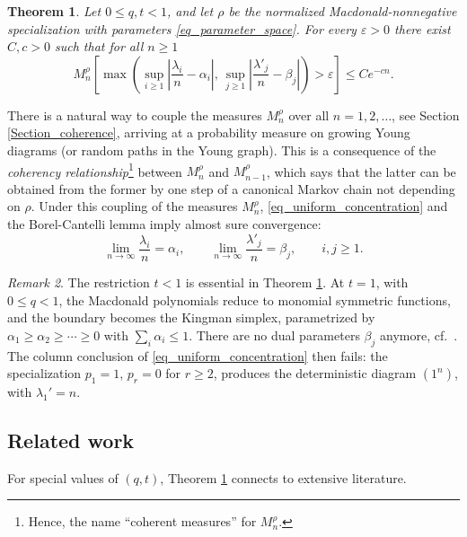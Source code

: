\documentclass[11pt,reqno]{amsart}
\newtheorem{theorem}{Theorem}[section]
\theoremstyle{definition}
\theoremstyle{remark}
\newtheorem{remark}[theorem]{Remark}
\numberwithin{equation}{section}
\begin{document}
\begin{theorem} \label{Theorem_uniform}
 Let $0\le q,t<1$, and let $\rho$ be the normalized Macdonald-nonnegative
specialization with parameters \eqref{eq_parameter_space}. For every $\varepsilon>0$
there exist $C,c>0$ such that for all $n\ge 1$
\begin{equation}\label{eq_uniform_concentration}
 M_n^\rho\left[
 \max\left(\sup_{i\ge1}\left|\frac{\lambda_i}{n}-\alpha_i\right|,
          \, \sup_{j\ge1}\left|\frac{\lambda'_j}{n}-\beta_j\right|\right)
 >\varepsilon\right]\le Ce^{-cn}.
\end{equation}
\end{theorem}

There is a natural way to couple the measures $M_n^\rho$ over all $n=1,2,\dots$, see Section \ref{Section_coherence},
arriving at a probability measure on growing Young diagrams (or random paths in the Young graph). This is a consequence of the \emph{coherency relationship}\footnote{Hence, the name ``coherent measures'' for $M_n^\rho$.} between $M_n^{\rho}$ and $M_{n-1}^\rho$, which says that the latter can be obtained from the former by one step of a canonical
Markov chain not depending on $\rho$.
Under this coupling of the measures $M_n^{\rho}$, \eqref{eq_uniform_concentration} and the Borel-Cantelli lemma imply almost sure convergence:
$$
 \lim_{n\to\infty} \frac{\lambda_i}{n}=\alpha_i,\qquad \lim_{n\to\infty} \frac{\lambda'_j}{n}=\beta_j, \qquad i,j\ge 1.
$$

\begin{remark}
The restriction $t<1$ is essential in Theorem \ref{Theorem_uniform}. At $t=1$, with $0\le q<1$,
the Macdonald polynomials reduce to monomial symmetric functions,
and the boundary becomes the Kingman simplex, parametrized by
$\alpha_1\ge\alpha_2\ge\cdots\ge0$ with $\sum_i\alpha_i\le1$. There are no dual parameters $\beta_j$ anymore, cf.\
\cite[Section~4]{KOO98}. The column conclusion of \eqref{eq_uniform_concentration} then fails:
the specialization $p_1=1$, $p_r=0$ for $r\ge2$, produces
the deterministic diagram $(1^n)$, with $\lambda_1'=n$.
\end{remark}



\subsection{Related work} For special values of $(q,t)$, Theorem \ref{Theorem_uniform} connects to extensive literature.
\end{document}
